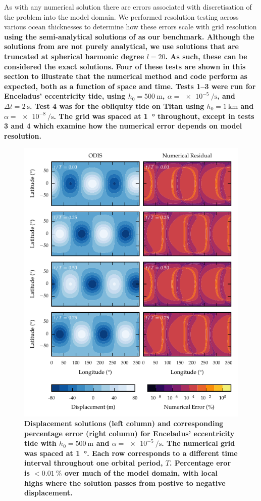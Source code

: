 As with any numerical solution there are errors associated with discretisation of the problem into the model domain. We performed resolution testing across various ocean thicknesses to determine how these errors scale with grid resolution \textbf{using the semi-analytical solutions of \citet{matsuyama2014tidal} as our benchmark. Although the solutions from \citet{matsuyama2014tidal} are not purely analytical, we use solutions that are truncated at spherical harmonic degree $l=20$. As such, these can be considered the exact solutions. Four of these tests are shown in this section to illustrate that the numerical method and code perform as expected, both as a function of space and time. Tests \numrange{1}{3} were run for Enceladus' eccentricity tide, using $h_0 = \SI{500}{\metre}$, $\alpha = \SI{e-5}{\per\second}$, and $\Delta t = \SI{2}{\second}$. Test 4 was for the obliquity tide on Titan using $h_0 = \SI{1}{\kilo\metre}$ and $\alpha = \SI{e-8}{\per\second}$. The grid was spaced at \SI{1}{\degree} throughout, except in tests 3 and 4 which examine how the numerical error depends on model resolution.}

\begin{figure}
\centering
\includegraphics[width=0.85\linewidth]{Figures/spatial_error_ecc}
\caption{\textbf{Displacement solutions (left column) and corresponding percentage error (right column) for Enceladus' eccentricity tide with $h_0 = \SI{500}{\metre}$ and $\alpha = \SI{e-5}{\per\second}$. The numerical grid was spaced at \SI{1}{\degree}. Each row corresponds to a different time interval throughout one orbital period, $T$. Percentage eror is  $< \SI{0.01}{\percent}$ over much of the model domain, with local highs where the solution passes from postive to negative displacement.} \label{fig:spatial_error}}
\end{figure}



